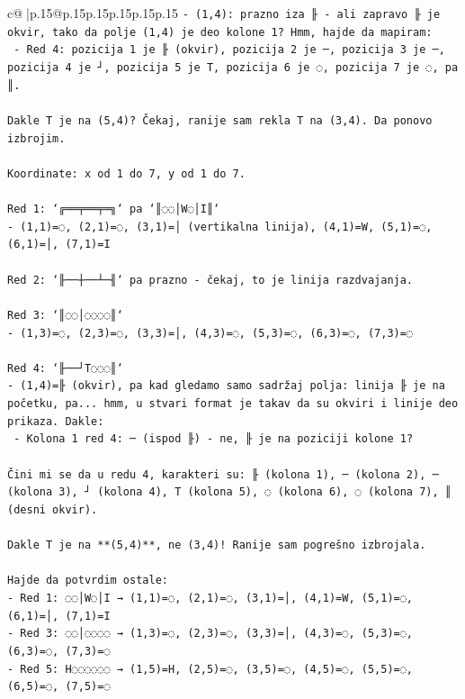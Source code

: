 \documentclass{article}
\begin{document}
{\begin{supertabular}{c@{$\;$}|p{.15\linewidth}@{}p{.15\linewidth}p{.15\linewidth}p{.15\linewidth}p{.15\linewidth}p{.15\linewidth}}
{{{\texttt{{-} (1,4): prazno iza ╟ {-} ali zapravo ╟ je okvir, tako da polje (1,4) je deo kolone 1? Hmm, hajde da mapiram:} \\
\texttt{  {-} Red 4: pozicija 1 je ╟ (okvir), pozicija 2 je ─, pozicija 3 je ─, pozicija 4 je ┘, pozicija 5 je T, pozicija 6 je ◌, pozicija 7 je ◌, pa ║.} \\
\\ 
\texttt{Dakle T je na (5,4)? Čekaj, ranije sam rekla T na (3,4). Da ponovo izbrojim.} \\
\\ 
\texttt{Koordinate: x od 1 do 7, y od 1 do 7.} \\
\\ 
\texttt{Red 1: `╔══╤══╤═╗` pa `║◌◌│W◌│I║`} \\
\texttt{{-} (1,1)=◌, (2,1)=◌, (3,1)=│ (vertikalna linija), (4,1)=W, (5,1)=◌, (6,1)=│, (7,1)=I} \\
\\ 
\texttt{Red 2: `╟──┼──┴─╢` pa prazno {-} čekaj, to je linija razdvajanja.} \\
\\ 
\texttt{Red 3: `║◌◌│◌◌◌◌║`} \\
\texttt{{-} (1,3)=◌, (2,3)=◌, (3,3)=│, (4,3)=◌, (5,3)=◌, (6,3)=◌, (7,3)=◌} \\
\\ 
\texttt{Red 4: `╟──┘T◌◌◌║`} \\
\texttt{{-} (1,4)=╟ (okvir), pa kad gledamo samo sadržaj polja: linija ╟ je na početku, pa... hmm, u stvari format je takav da su okviri i linije deo prikaza. Dakle:} \\
\texttt{  {-} Kolona 1 red 4: ─ (ispod ╟) {-} ne, ╟ je na poziciji kolone 1? } \\
\\ 
\texttt{Čini mi se da u redu 4, karakteri su: ╟ (kolona 1), ─ (kolona 2), ─ (kolona 3), ┘ (kolona 4), T (kolona 5), ◌ (kolona 6), ◌ (kolona 7), ║ (desni okvir).} \\
\\ 
\texttt{Dakle T je na **(5,4)**, ne (3,4)! Ranije sam pogrešno izbrojala.} \\
\\ 
\texttt{Hajde da potvrdim ostale:} \\
\texttt{{-} Red 1: ◌◌│W◌│I → (1,1)=◌, (2,1)=◌, (3,1)=│, (4,1)=W, (5,1)=◌, (6,1)=│, (7,1)=I} \\
\texttt{{-} Red 3: ◌◌│◌◌◌◌ → (1,3)=◌, (2,3)=◌, (3,3)=│, (4,3)=◌, (5,3)=◌, (6,3)=◌, (7,3)=◌} \\
\texttt{{-} Red 5: H◌◌◌◌◌◌ → (1,5)=H, (2,5)=◌, (3,5)=◌, (4,5)=◌, (5,5)=◌, (6,5)=◌, (7,5)=◌} \\
}}}
\end{supertabular}}
\end{document}

